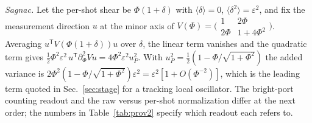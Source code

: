 \documentclass[aps,pra,twocolumn,superscriptaddress,nofootinbib,floatfix]{revtex4-2}
\begin{document}
\textit{Sagnac.} Let the per-shot shear be $\Phi(1+\delta)$ with $\langle\delta\rangle=0$, $\langle\delta^2\rangle=\varepsilon^2$,
and fix the measurement direction $u$ at the minor axis of $V(\Phi)=\bigl(\begin{smallmatrix}1&2\Phi\\2\Phi&1+4\Phi^2\end{smallmatrix}\bigr)$.
Averaging $u^{\mathsf T}V(\Phi(1+\delta))u$ over $\delta$, the linear term vanishes and the quadratic term gives
$\tfrac12\Phi^2\varepsilon^2\,u^{\mathsf T}\partial_\Phi^2Vu=4\Phi^2\varepsilon^2u_P^2$. With
$u_P^2=\tfrac12(1-\Phi/\sqrt{1+\Phi^2})$ the added variance is
$2\Phi^2(1-\Phi/\sqrt{1+\Phi^2})\varepsilon^2=\varepsilon^2[1+O(\Phi^{-2})]$, which is the leading term quoted in
Sec.~\ref{sec:stage} for a tracking local oscillator. The bright-port counting readout and the raw versus per-shot
normalization differ at the next order; the numbers in Table~\ref{tab:prov2} specify which readout each refers to.
\end{document}
